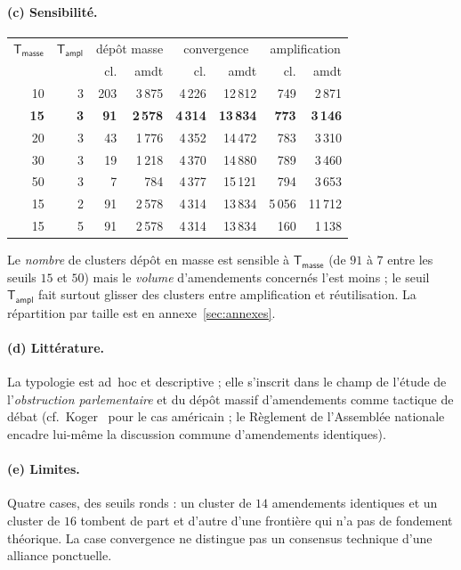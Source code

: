 \documentclass[11pt,a4paper]{article}
\newcommand{\param}[1]{\ensuremath{\mathsf{#1}}}
\begin{document}
\paragraph{(c) Sensibilité.}
\begin{center}\small
\begin{tabular}{rr rr rr rr}
\toprule
$\param{T_{masse}}$ & $\param{T_{ampl}}$ & \multicolumn{2}{c}{dépôt masse} & \multicolumn{2}{c}{convergence} & \multicolumn{2}{c}{amplification} \\
 & & cl. & amdt & cl. & amdt & cl. & amdt \\
\midrule
10 & 3 & 203 & 3\,875 & 4\,226 & 12\,812 & 749 & 2\,871 \\
\textbf{15} & \textbf{3} & \textbf{91} & \textbf{2\,578} & \textbf{4\,314} & \textbf{13\,834} & \textbf{773} & \textbf{3\,146} \\
20 & 3 & 43 & 1\,776 & 4\,352 & 14\,472 & 783 & 3\,310 \\
30 & 3 & 19 & 1\,218 & 4\,370 & 14\,880 & 789 & 3\,460 \\
50 & 3 & \phantom{0}7 & \phantom{0,}784 & 4\,377 & 15\,121 & 794 & 3\,653 \\
\midrule
15 & 2 & 91 & 2\,578 & 4\,314 & 13\,834 & 5\,056 & 11\,712 \\
15 & 5 & 91 & 2\,578 & 4\,314 & 13\,834 & 160 & 1\,138 \\
\bottomrule
\end{tabular}
\end{center}
Le \emph{nombre} de clusters \og{}dépôt en masse\fg{} est sensible à
$\param{T_{masse}}$ (de $91$ à $7$ entre les seuils $15$ et $50$) mais le
\emph{volume} d'amendements concernés l'est moins ; le seuil $\param{T_{ampl}}$
fait surtout glisser des clusters entre \og{}amplification\fg{} et
\og{}réutilisation\fg{}. La répartition par taille est en annexe~\ref{sec:annexes}.

\paragraph{(d) Littérature.} La typologie est ad~hoc et descriptive ; elle
s'inscrit dans le champ de l'étude de l'\emph{obstruction parlementaire} et du
dépôt massif d'amendements comme tactique de débat (cf.~Koger~\cite{koger2010}
pour le cas américain ; le Règlement de l'Assemblée nationale encadre lui-même la
\og{}discussion commune\fg{} d'amendements identiques).

\paragraph{(e) Limites.} Quatre cases, des seuils ronds : un cluster de $14$
amendements identiques et un cluster de $16$ tombent de part et d'autre d'une
frontière qui n'a pas de fondement théorique. La case \og{}convergence\fg{} ne
distingue pas un consensus technique d'une alliance ponctuelle.
\end{document}
